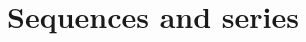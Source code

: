 \documentclass[../book/calcnotes.tex]{subfiles}
\begin{document}
\chapter{Sequences and series}
\label{sec:seqs-and-series}
\end{document}
